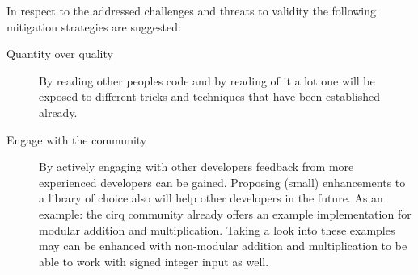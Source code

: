 In respect to the addressed challenges and threats to validity the following mitigation strategies are suggested:
\begin{description}
  \item [Quantity over quality] By reading other peoples code and by reading of it a lot one will be exposed to different tricks and techniques that have been established already.
  \item [Engage with the community] By actively engaging with other developers feedback from more experienced developers can be gained. Proposing (small) enhancements to a library of choice also will help other developers in the future. As an example: the cirq community already offers an example implementation for modular addition and multiplication. Taking a look into \cite{Sahin_2020} these examples may can be enhanced with non-modular addition and multiplication to be able to work with signed integer input as well.
\end{description}

